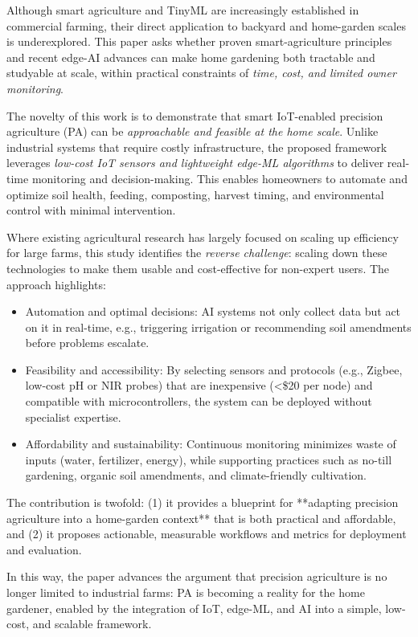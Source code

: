 \documentclass{sigchi}
\begin{document}
Although smart agriculture and TinyML are increasingly established in commercial farming, their direct application to backyard and home-garden scales is underexplored. This paper asks whether proven smart-agriculture principles and recent edge-AI advances can make home gardening both tractable and studyable at scale, within practical constraints of \emph{time, cost, and limited owner monitoring}.

The novelty of this work is to demonstrate that smart IoT-enabled precision agriculture (PA) can be \emph{approachable and feasible at the home scale}. Unlike industrial systems that require costly infrastructure, the proposed framework leverages \emph{low-cost IoT sensors and lightweight edge-ML algorithms} to deliver real-time monitoring and decision-making. This enables homeowners to automate and optimize soil health, feeding, composting, harvest timing, and environmental control with minimal intervention.

Where existing agricultural research has largely focused on scaling up efficiency for large farms, this study identifies the \emph{reverse challenge}: scaling down these technologies to make them usable and cost-effective for non-expert users. The approach highlights:
\begin{itemize}
\item Automation and optimal decisions: AI systems not only collect data but act on it in real-time, e.g., triggering irrigation or recommending soil amendments before problems escalate.
\item Feasibility and accessibility: By selecting sensors and protocols (e.g., Zigbee, low-cost pH or NIR probes) that are inexpensive (<\$20 per node) and compatible with microcontrollers, the system can be deployed without specialist expertise.
\item Affordability and sustainability: Continuous monitoring minimizes waste of inputs (water, fertilizer, energy), while supporting practices such as no-till gardening, organic soil amendments, and climate-friendly cultivation.
\end{itemize}
The contribution is twofold: (1) it provides a blueprint for **adapting precision agriculture into a home-garden context** that is both practical and affordable, and (2) it proposes actionable, measurable workflows and metrics for deployment and evaluation.

In this way, the paper advances the argument that precision agriculture is no longer limited to industrial farms: PA is becoming a reality for the home gardener, enabled by the integration of IoT, edge-ML, and AI into a simple, low-cost, and scalable framework.
\end{document}
